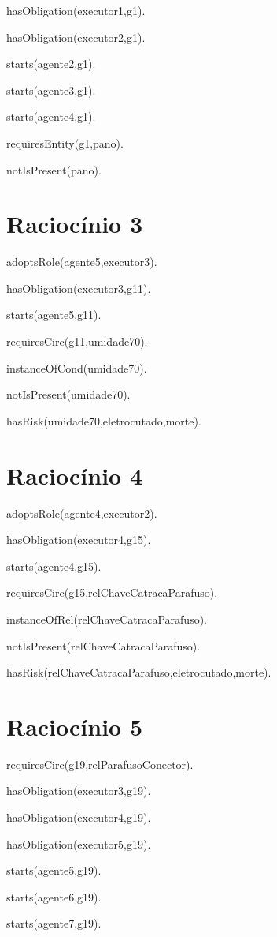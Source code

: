 hasObligation(executor1,g1).

hasObligation(executor2,g1).

starts(agente2,g1). 

starts(agente3,g1).	 	

starts(agente4,g1).

requiresEntity(g1,pano).		

notIsPresent(pano).

\section{Raciocínio 3}


adoptsRole(agente5,executor3).

hasObligation(executor3,g11).	

starts(agente5,g11).

requiresCirc(g11,umidade70).

instanceOfCond(umidade70).

notIsPresent(umidade70).

hasRisk(umidade70,eletrocutado,morte).

\section{Raciocínio 4}

adoptsRole(agente4,executor2).

hasObligation(executor4,g15).	

starts(agente4,g15).

requiresCirc(g15,relChaveCatracaParafuso).

instanceOfRel(relChaveCatracaParafuso).	

notIsPresent(relChaveCatracaParafuso).

hasRisk(relChaveCatracaParafuso,eletrocutado,morte).

\section{Raciocínio 5}

requiresCirc(g19,relParafusoConector).

hasObligation(executor3,g19).

hasObligation(executor4,g19).

hasObligation(executor5,g19).

starts(agente5,g19).

starts(agente6,g19).

starts(agente7,g19).

